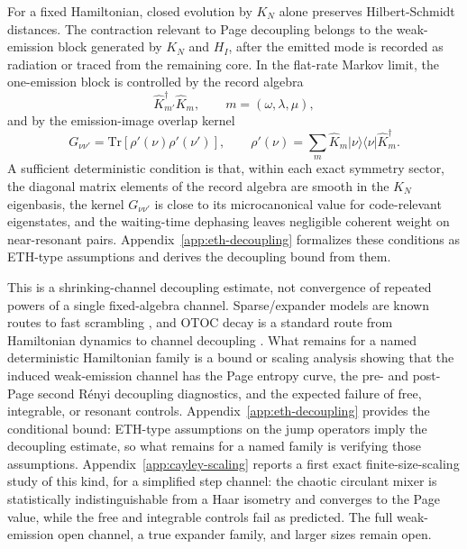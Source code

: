\documentclass[12pt]{article}
\newcommand{\Tr}{\mathrm{Tr}}
\newcommand{\ket}[1]{|#1\rangle}
\newcommand{\bra}[1]{\langle #1|}
\begin{document}
For a fixed Hamiltonian, closed evolution by $K_N$ alone preserves
Hilbert-Schmidt distances.  The contraction relevant to Page decoupling
belongs to the weak-emission block generated by $K_N$ and $H_I$, after the
emitted mode is recorded as radiation or traced from the remaining core.  In
the flat-rate Markov limit, the one-emission block is controlled by the record
algebra
\begin{equation}
    \widehat K_{m'}^\dagger\widehat K_m,
    \qquad
    m=(\omega,\lambda,\mu),
\end{equation}
and by the emission-image overlap kernel
\begin{equation}
    G_{\nu\nu'}
    =
    \Tr\!\left[
    \rho'(\nu)\rho'(\nu')
    \right],
    \qquad
    \rho'(\nu)
    =
    \sum_m\widehat K_m\ket\nu\bra\nu\widehat K_m^\dagger .
\end{equation}
A sufficient deterministic condition is that, within each exact symmetry
sector, the diagonal matrix elements of the record algebra are smooth in the
$K_N$ eigenbasis, the kernel $G_{\nu\nu'}$ is close to its microcanonical value
for code-relevant eigenstates, and the waiting-time dephasing leaves negligible
coherent weight on near-resonant pairs.
Appendix~\ref{app:eth-decoupling} formalizes these conditions as ETH-type
assumptions and derives the decoupling bound from them.

This is a shrinking-channel decoupling estimate, not convergence of repeated
powers of a single fixed-algebra channel.  Sparse/expander models are known
routes to fast scrambling \cite{BarbonMagan2012,BentsenGuLucas2019}, and OTOC
decay is a standard route from Hamiltonian dynamics to channel decoupling
\cite{HosurQiRobertsYoshida2016,YoshidaKitaev2017}.  What remains for a named
deterministic Hamiltonian family is a bound or scaling analysis showing that
the induced weak-emission channel has the Page entropy curve, the pre- and
post-Page second R\'enyi decoupling diagnostics, and the expected failure of
free, integrable, or resonant controls.
Appendix~\ref{app:eth-decoupling} provides the conditional bound: ETH-type
assumptions on the jump operators imply the decoupling estimate, so what
remains for a named family is verifying those assumptions.
Appendix~\ref{app:cayley-scaling} reports a first exact finite-size-scaling
study of this kind, for a simplified step channel: the chaotic circulant
mixer is statistically indistinguishable from a Haar isometry and converges
to the Page value, while the free and integrable controls fail as predicted.
The full weak-emission open channel, a true expander family, and larger sizes
remain open.
\end{document}
